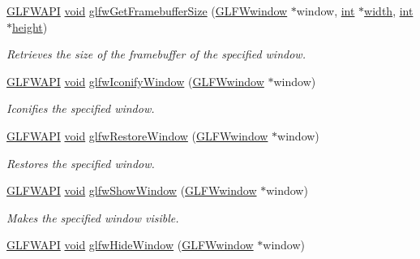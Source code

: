 \begin{DoxyCompactItemize}
\hyperlink{glfw3_8h_a56da5036b2cc259351ae22fd6439bb47}{G\-L\-F\-W\-A\-P\-I} \hyperlink{wglew_8h_aeea6e3dfae3acf232096f57d2d57f084}{void} \hyperlink{group__window_gaf7d17f3534b4b6dc9a6f905e3a240b7e}{glfw\-Get\-Framebuffer\-Size} (\hyperlink{group__window_ga3c96d80d363e67d13a41b5d1821f3242}{G\-L\-F\-Wwindow} $\ast$window, \hyperlink{wglew_8h_a500a82aecba06f4550f6849b8099ca21}{int} $\ast$\hyperlink{glew_8h_aa105b18f96e6bc2485cb7f576a7fb9ba}{width}, \hyperlink{wglew_8h_a500a82aecba06f4550f6849b8099ca21}{int} $\ast$\hyperlink{glew_8h_aa214bd63e12f7ddf524c83894fcc69a7}{height})
\begin{DoxyCompactList}\small\item\em Retrieves the size of the framebuffer of the specified window. \end{DoxyCompactList}\item 
\hyperlink{glfw3_8h_a56da5036b2cc259351ae22fd6439bb47}{G\-L\-F\-W\-A\-P\-I} \hyperlink{wglew_8h_aeea6e3dfae3acf232096f57d2d57f084}{void} \hyperlink{group__window_ga24274e3c6ecd44e11fec5e6b66e4d7f3}{glfw\-Iconify\-Window} (\hyperlink{group__window_ga3c96d80d363e67d13a41b5d1821f3242}{G\-L\-F\-Wwindow} $\ast$window)
\begin{DoxyCompactList}\small\item\em Iconifies the specified window. \end{DoxyCompactList}\item 
\hyperlink{glfw3_8h_a56da5036b2cc259351ae22fd6439bb47}{G\-L\-F\-W\-A\-P\-I} \hyperlink{wglew_8h_aeea6e3dfae3acf232096f57d2d57f084}{void} \hyperlink{group__window_ga1e29caf0b819f578b04db52fff17256c}{glfw\-Restore\-Window} (\hyperlink{group__window_ga3c96d80d363e67d13a41b5d1821f3242}{G\-L\-F\-Wwindow} $\ast$window)
\begin{DoxyCompactList}\small\item\em Restores the specified window. \end{DoxyCompactList}\item 
\hyperlink{glfw3_8h_a56da5036b2cc259351ae22fd6439bb47}{G\-L\-F\-W\-A\-P\-I} \hyperlink{wglew_8h_aeea6e3dfae3acf232096f57d2d57f084}{void} \hyperlink{group__window_ga7945bcdff9e5e058cf36505d6873ed8c}{glfw\-Show\-Window} (\hyperlink{group__window_ga3c96d80d363e67d13a41b5d1821f3242}{G\-L\-F\-Wwindow} $\ast$window)
\begin{DoxyCompactList}\small\item\em Makes the specified window visible. \end{DoxyCompactList}\item 
\hyperlink{glfw3_8h_a56da5036b2cc259351ae22fd6439bb47}{G\-L\-F\-W\-A\-P\-I} \hyperlink{wglew_8h_aeea6e3dfae3acf232096f57d2d57f084}{void} \hyperlink{group__window_gaa17e287d521544bdeceafa09ac036e20}{glfw\-Hide\-Window} (\hyperlink{group__window_ga3c96d80d363e67d13a41b5d1821f3242}{G\-L\-F\-Wwindow} $\ast$window)

\end{DoxyCompactItemize}
